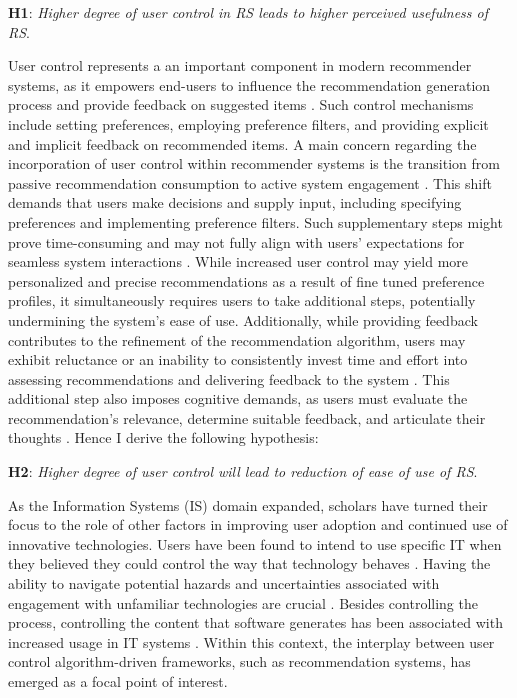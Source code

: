 \documentclass[a4paper,12pt]{article}
\begin{document}
\textbf{H1}:  \textit{Higher degree of user control in RS leads to higher perceived usefulness of  RS}. 

User control represents a an important component in modern recommender systems, as it empowers end-users to influence the recommendation generation process and provide feedback on suggested items \citep{pu2012evaluating}. Such control mechanisms include setting preferences, employing preference filters, and providing explicit and implicit feedback on recommended items. A main concern regarding the incorporation of user control within recommender systems is the transition from passive recommendation consumption to active system engagement \citep{knijnenburg2011each}. This shift demands that users make decisions and supply input, including specifying preferences and implementing preference filters. Such supplementary steps might prove time-consuming and may not fully align with users' expectations for seamless system interactions \citep{xiao2007commerce}. While increased user control may yield more personalized and precise recommendations as a result of fine tuned preference profiles, it simultaneously requires users to take additional steps, potentially undermining the system's ease of use. Additionally, while providing feedback contributes to the refinement of the recommendation algorithm, users may exhibit reluctance or an inability to consistently invest time and effort into assessing recommendations and delivering feedback to the system \citep{herlocker2000explaining}. This additional step also imposes cognitive demands, as users must evaluate the recommendation's relevance, determine suitable feedback, and articulate their thoughts \citep{knijnenburgExplainingUserExperience2012}. Hence I derive the following hypothesis:

\textbf{H2}: \textit{Higher degree of user control will lead to reduction of ease of use of RS}. 

As the Information Systems (IS) domain expanded, scholars have turned their focus to the role of other factors in improving user adoption and continued use of innovative technologies. Users have been found to intend to  use specific IT when they believed they could control the way that technology behaves \citep{teo2019students}.  Having the ability to navigate potential hazards and uncertainties associated with engagement with unfamiliar technologies are crucial \citep{gefen2003trust}. Besides controlling the process, controlling the content that software generates has been associated with increased usage in IT systems \citep{lee2006empirical}.  Within this context, the interplay between user control algorithm-driven  frameworks, such as recommendation systems, has emerged as a focal point of interest.
\end{document}
